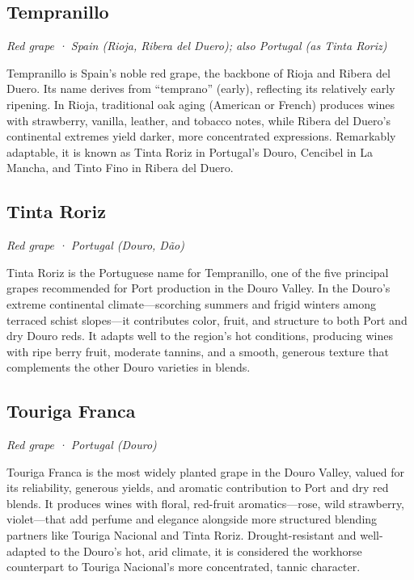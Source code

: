 \subsection*{Tempranillo}
\textit{Red grape · Spain (Rioja, Ribera del Duero); also Portugal (as Tinta Roriz)}\par\smallskip

Tempranillo is Spain’s noble red grape, the backbone of Rioja and Ribera del Duero. Its name derives from “temprano” (early), reflecting its relatively early ripening. In Rioja, traditional oak aging (American or French) produces wines with strawberry, vanilla, leather, and tobacco notes, while Ribera del Duero’s continental extremes yield darker, more concentrated expressions. Remarkably adaptable, it is known as Tinta Roriz in Portugal’s Douro, Cencibel in La Mancha, and Tinto Fino in Ribera del Duero.

\subsection*{Tinta Roriz}
\textit{Red grape · Portugal (Douro, Dão)}\par\smallskip

Tinta Roriz is the Portuguese name for Tempranillo, one of the five principal grapes recommended for Port production in the Douro Valley. In the Douro’s extreme continental climate—scorching summers and frigid winters among terraced schist slopes—it contributes color, fruit, and structure to both Port and dry Douro reds. It adapts well to the region’s hot conditions, producing wines with ripe berry fruit, moderate tannins, and a smooth, generous texture that complements the other Douro varieties in blends.

\subsection*{Touriga Franca}
\textit{Red grape · Portugal (Douro)}\par\smallskip

Touriga Franca is the most widely planted grape in the Douro Valley, valued for its reliability, generous yields, and aromatic contribution to Port and dry red blends. It produces wines with floral, red-fruit aromatics—rose, wild strawberry, violet—that add perfume and elegance alongside more structured blending partners like Touriga Nacional and Tinta Roriz. Drought-resistant and well-adapted to the Douro’s hot, arid climate, it is considered the workhorse counterpart to Touriga Nacional’s more concentrated, tannic character.


